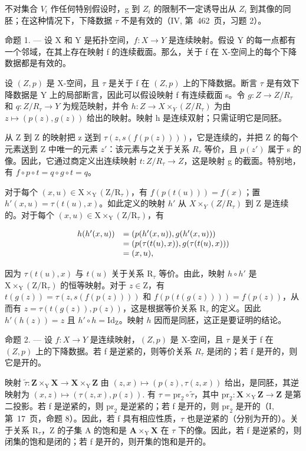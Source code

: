 不对集合 \(V_{i}\) 作任何特别假设时，g 到 \(Z_{i}\) 的限制不一定诱导出从 \(Z_{i}\) 到其像的同胚；在这种情况下，下降数据 \(\tau\) 不是有效的（IV, 第~462~页，习题 2）。

命题 1. --- 设 X 和 Y 是拓扑空间，\(f: X \to Y\) 是连续映射。假设 Y 的每一点都有一个邻域，在其上存在映射 f 的连续截面。那么，关于 f 在 X-空间上的每个下降数据都是有效的。

设 \((Z,p)\) 是 X-空间，且 \(\tau\) 是关于 f 在 \((Z,p)\) 上的下降数据。断言 \(\tau\) 是有效下降数据是 Y 上的局部断言，因此可以假设映射 f 有连续截面 s。令 \(g: Z \to Z/R_{\tau}\) 和 \(q: Z/R_{\tau} \to Y\) 为规范映射，并令 \(h: Z \to X \times_{Y} (Z/R_{\tau})\) 为由 \(z \mapsto (p(z), g(z))\) 给出的映射。映射 h 是连续双射；只需证明它是同胚。

从 Z 到 Z 的映射把 z 送到 \(\tau(z,s(f(p(z))))\)，它是连续的，并把 Z 的每个元素送到 Z 中唯一的元素 \(z'\)：该元素与之关于关系 \(R_{\tau}\) 等价，且 \(p(z')\) 属于 s 的像。因此，它通过商定义出连续映射 \(t:Z/R_{\tau}\to Z\)，这是映射 g 的截面。特别地，有 \(f\circ p\circ t=q\circ g\circ t=q\)。

对于每个 \((x,u)\in\mathrm{X}\times_{\mathrm{Y}}(\mathrm{Z}/\mathrm{R}_{\tau})\)，有 \(f(p(t(u)))=f(x)\)；置 \(h'(x,u)=\tau(t(u),x)\)。如此定义的映射 \(h'\) 从 \(X\times_{Y}(Z/R_{\tau})\) 到 Z 是连续的。对于每个 \((x,u)\in\mathrm{X}\times_{\mathrm{Y}}(\mathrm{Z}/\mathrm{R}_{\tau})\)，有

\[
\begin{array}{r l} h (h ^ {\prime} (x, u)) & = (p (h ^ {\prime} (x, u)), g (h ^ {\prime} (x, u))) \\ & = (p (\tau (t (u), x)), g (\tau (t (u), x))) \\ & = (x, u), \end{array}
\]

因为 \(\tau(t(u), x)\) 与 \(t(u)\) 关于关系 \(\mathrm{R}_{\tau}\) 等价。由此，映射 \(h \circ h'\) 是 \(\mathrm{X} \times_{\mathrm{Y}} (\mathrm{Z}/\mathrm{R}_{\tau})\) 的恒等映射。对于 \(z \in \mathrm{Z}\)，有 \(t(g(z)) = \tau(z, s(f(p(z))))\) 和 \(f(p(t(g(z)))) = f(p(z))\)，从而有 \(z = \tau(t(g(z)), p(z))\)，这是根据等价关系 \(\mathrm{R}_{\tau}\) 的定义。因此 \(h'(h(z)) = z\) 且 \(h' \circ h = \mathrm{Id}_{\mathrm{Z}}\)。映射 \(h\) 因而是同胚，这正是要证明的结论。

命题 2. --- 设 \(f\colon X \to Y\) 是连续映射，\((Z,p)\) 是 X-空间，且 \(\tau\) 是关于 f 在 \((Z,p)\) 上的下降数据。若 f 是逆紧的，则等价关系 \(R_{\tau}\) 是闭的；若 f 是开的，则它是开的。

映射 \(\widetilde{\tau}\colon\mathbf{Z}\times_{\mathrm{Y}}\mathbf{X}\to\mathbf{X}\times_{\mathrm{Y}}\mathbf{Z}\) 由 \((z,x)\mapsto(p(z),\tau(z,x))\) 给出，是同胚，其逆映射为 \((x,z)\mapsto(\tau(z,x),p(z)).\) 有 \(\tau=\mathrm{pr}_{2}\circ\widetilde{\tau}\)，其中 \(\mathrm{pr}_{2}\colon\mathbf{X}\times_{\mathrm{Y}}\mathbf{Z}\to\mathbf{Z}\) 是第二投影。若 f 是逆紧的，则 \(\mathrm{pr}_{2}\) 是逆紧的；若 f 是开的，则 \(\mathrm{pr}_{2}\) 是开的（I, 第~17~页，命题 8）。因此，若 f 具有相应性质，\(\tau\) 也是逆紧的（分别为开的）。关于关系 \(\mathrm{R}_{\tau}\)，Z 的子集 A 的饱和是 \(\mathbf{A}\times_{\mathrm{Y}}\mathbf{X}\) 在 \(\tau\) 下的像。因此，若 f 是逆紧的，则闭集的饱和是闭的；若 f 是开的，则开集的饱和是开的。

